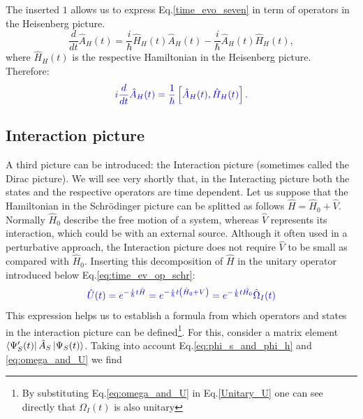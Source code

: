 \documentclass[12pt, titlepage]{article}
\begin{document}
The inserted $ 1 $ allows us to express Eq.\enskip\eqref{time_evo_seven} in term of operators in the Heisenberg picture.
\begin{equation}
\frac{d}{dt}\hat{A}_{H}(t)
	=\frac{i}{\hbar}
	\hat{H}_{H}(t)\hat{A}_{H}(t)
	-
	\frac{i}{\hbar}
	\hat{A}_{H}(t)\hat{H}_{H}(t),
\end{equation} 
where $ \hat{H}_{H}(t) $ is the respective Hamiltonian in the Heisenberg  picture.
Therefore:
\begin{equation}\label{eq:Heisenberg_time_dep._eq.}
\textcolor[RGB]{0,0,204}{
i\frac{d}{d t}\hat{A}_{H}(t)=
\frac{1}{\hbar}\left[ \hat{A}_{H}(t),\hat{H}_{H}(t)\right] 
.
}
\end{equation} 
\subsection{Interaction picture}\label{Interactionpicture}
A third picture can be introduced: the Interaction picture (sometimes called the Dirac picture). We will see very shortly that, in the Interacting picture both the states and the respective operators are time dependent.
Let us suppose that the Hamiltonian in the Schrödinger picture can be splitted as follows $ \hat{H} = \hat{H}_{0}+\hat{V} $. Normally $ \hat{H}_{0} $ describe the free motion of a system, whereas  $ \hat{V} $ represents its interaction, which could be with an external source. Although it often used in a perturbative approach, the Interaction picture does not require $ \hat{V} $  to be small as compared with $ \hat{H}_{0} $. 
Inserting this decomposition of $ \hat{H} $ in the unitary operator introduced below Eq.\enskip\eqref{eq:time_ev_op_schr}:
\begin{equation}\label{eq:omega_and_U}
\textcolor[RGB]{0,0,204}{
\hat{U}(t)=e^{-\frac{i}{\hbar}t \hat{H}}
=e^{-\frac{i}{\hbar}t\left(  \hat{H}_{0}+V\right) }
=
e^{-\frac{i}{\hbar}t \hat{H_{0}}}
\hat{\Omega}_{I} (t)
}
\end{equation}
This expression helps us to establish a formula from which operators and states in the interaction picture can be defined\footnote{By substituting Eq.\enskip\eqref{eq:omega_and_U} in Eq.\enskip\eqref{Unitary_U} one can see directly that $ \Omega_{I}(t) $ is also unitary}. For this, consider a matrix element $ 	\bra{\Psi_{S}^{\prime}(t)}
	\hat{A}_{S}
	\ket{\Psi_{S}(t)} $. Taking into account Eq.\enskip\eqref{eq:phi_s_and_phi_h} and \eqref{eq:omega_and_U} we find
\end{document}
